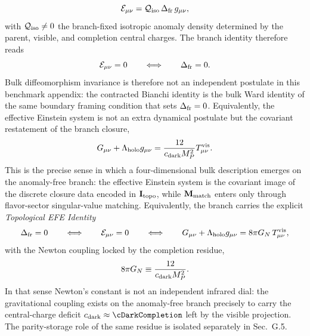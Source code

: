 \documentclass[11pt]{article}
\begin{document}
\begin{equation}
\label{eq:gravity-topological-identity-local}
 \mathcal E_{\mu\nu}=\mathcal Q_{\rm iso}\,\Delta_{\rm fr}\,g_{\mu\nu},
\end{equation}
with $\mathcal Q_{\rm iso}\neq 0$ the branch-fixed isotropic anomaly density determined by the parent, visible, and completion central charges. The branch identity therefore reads
\begin{equation}
 \mathcal E_{\mu\nu}=0
 \qquad\Longleftrightarrow\qquad
 \Delta_{\rm fr}=0.
\end{equation}
Bulk diffeomorphism invariance is therefore not an independent postulate in this benchmark appendix: the contracted Bianchi identity is the bulk Ward identity of the same boundary framing condition that sets $\Delta_{\rm fr}=0$.
Equivalently, the effective Einstein system is not an extra dynamical postulate but the covariant restatement of the branch closure,
\begin{equation}
\label{eq:gravity-effective-einstein-local}
 G_{\mu\nu}+\Lambda_{\rm holo}g_{\mu\nu}
 =
 \frac{12}{c_{\rm dark}M_P^2}T^{\rm vis}_{\mu\nu}.
\end{equation}
This is the precise sense in which a four-dimensional bulk description emerges on the anomaly-free branch: the effective Einstein system is the covariant image of the discrete closure data encoded in $\mathbf I_{\rm topo}$, while $\mathbf M_{\rm match}$ enters only through flavor-sector singular-value matching. Equivalently, the branch carries the explicit \textit{Topological EFE Identity}
\begin{equation}
\label{eq:gravity-topological-efe-identity}
 \Delta_{\rm fr}=0
 \qquad\Longleftrightarrow\qquad
 \mathcal E_{\mu\nu}=0
 \qquad\Longleftrightarrow\qquad
 G_{\mu\nu}+\Lambda_{\rm holo}g_{\mu\nu}
 =
 8\pi G_N\,T^{\rm vis}_{\mu\nu},
\end{equation}
with the Newton coupling locked by the completion residue,
\begin{equation}
\label{eq:gravity-newton-lock-local}
 8\pi G_N
 \equiv
 \frac{12}{c_{\rm dark}M_P^2}.
\end{equation}
In that sense Newton's constant is not an independent infrared dial: the gravitational coupling exists on the anomaly-free branch precisely to carry the central-charge deficit $c_{\rm dark}\approx\cDarkCompletion$ left by the visible projection. The parity-storage role of the same residue is isolated separately in Sec.~G.5.
\end{document}
